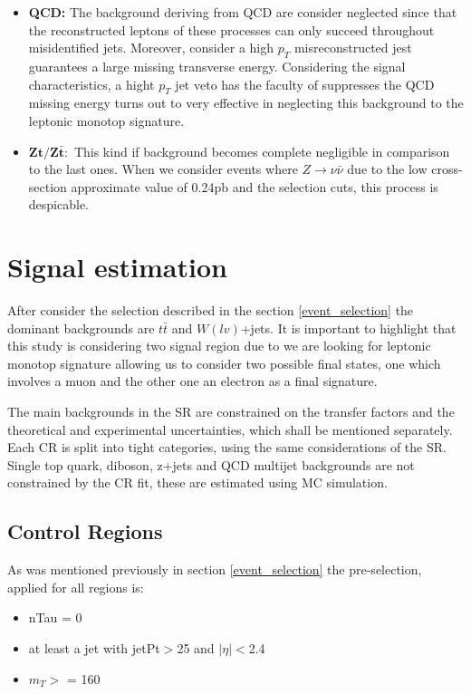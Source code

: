 \begin{itemize}
\item \textbf{QCD:} The background deriving from QCD are consider neglected since that the reconstructed leptons of these processes can only succeed throughout misidentified jets. Moreover, consider a high $p_{T}$ misreconstructed jest guarantees a large missing transverse energy. Considering the signal characteristics, a hight $p_{T}$ jet veto has the faculty of suppresses the QCD missing energy turns out to very effective in neglecting this background to the leptonic monotop signature.
\item $\mathbf{Zt/Z\bar{t}:}$ This kind if background becomes complete negligible in comparison to the last ones. When we consider events where $Z\rightarrow \nu \bar{\nu}$ due to the low cross-section approximate value of 0.24pb and the selection cuts, this process is despicable. 
\end{itemize}

\section{Signal estimation}

\noindent After consider the selection described in the section \ref{event_selection} the dominant backgrounds are $t\bar{t}$ and $W(lv)$+jets. It is important to highlight that this study is considering two signal region due to we are looking for leptonic monotop signature allowing us to consider two possible final states, one which involves a muon and the other one an electron as a final signature.

The main backgrounds in the SR are constrained on the transfer factors and the theoretical and experimental uncertainties, which shall be mentioned separately. Each CR is split into tight categories, using the same considerations of the SR. Single top quark, diboson, z+jets and QCD multijet backgrounds are not constrained by the CR fit, these are estimated using MC simulation.     

\subsection{Control Regions}
As was mentioned previously in section \ref{event_selection} the pre-selection, applied for all regions is:

\begin{itemize}
\itemsep=0pt\topsep=0pt\partopsep=0pt
\item nTau = 0 
\item at least a jet with jetPt$ > $25 and $|\eta|<$2.4
\item $m_{T}>$ = 160
\end{itemize}

